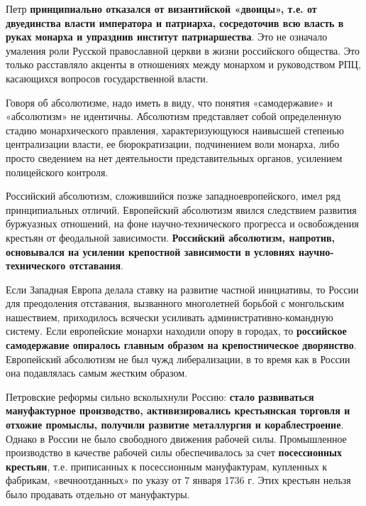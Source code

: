 \documentclass{article}
\begin{document}
Петр \textbf{принципиально отказался от византийской «двоицы», т.е. от двуединства власти императора и патриарха, сосредоточив всю власть в руках монарха и упразднив институт патриаршества}. Это не означало умаления роли Русской православной церкви в жизни российского общества. Это только расставляло акценты в отношениях между монархом и руководством РПЦ, касающихся вопросов государственной власти.

\hfill

Говоря об абсолютизме, надо иметь в виду, что понятия «самодержавие» и «абсолютизм» не идентичны. Абсолютизм представляет собой определенную стадию монархического правления, характеризующуюся наивысшей степенью централизации власти, ее бюрократизации, подчинением воли монарха, либо просто сведением на нет деятельности представительных органов, усилением полицейского контроля.

\hfill

Российский абсолютизм, сложившийся позже западноевропейского, имел ряд принципиальных отличий. Европейский абсолютизм явился следствием развития буржуазных отношений, на фоне научно-технического прогресса и освобождения крестьян от феодальной зависимости. \textbf{Российский абсолютизм, напротив, основывался на усилении крепостной зависимости в условиях научно-технического отставания}.

\hfill

Если Западная Европа делала ставку на развитие частной инициативы, то России для преодоления отставания, вызванного многолетней борьбой с монгольским нашествием, приходилось всячески усиливать административно-командную систему. Если европейские монархи находили опору в городах, то \textbf{российское самодержавие опиралось главным образом на крепостническое дворянство}. Европейский абсолютизм не был чужд либерализации, в то время как в России она подавлялась самым жестким образом. 

\hfill

Петровские реформы сильно всколыхнули Россию: \textbf{стало развиваться мануфактурное производство, активизировались крестьянская торговля и отхожие промыслы, получили развитие металлургия и кораблестроение}. Однако в России не было свободного движения рабочей силы. Промышленное производство в качестве рабочей силы обеспечивалось за счет \textbf{посессионных крестьян}, т.е. приписанных к посессионным мануфактурам, купленных к фабрикам, «вечноотданных» по указу от 7 января 1736 г. Этих крестьян нельзя было продавать отдельно от мануфактуры.

\hfill
\end{document}
